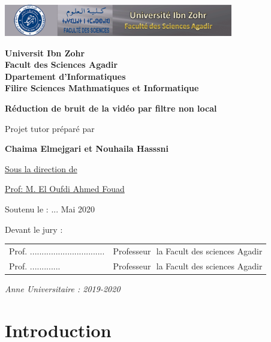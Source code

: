 \documentclass[12pt,a4paper]{report}
\numberwithin{equation}{subsection}
\numberwithin{equation}{section}
\begin{document}
\begin{titlepage}
\begin{center}

\vfill
\includegraphics[width=0.75\textwidth]{fsa.png}

\large{\textbf{Universit Ibn Zohr\\
Facult des Sciences Agadir\\
Dpartement d'Informatiques\\
Filire Sciences Mathmatiques et Informatique
}}

\vfill

\Large\textbf{Réduction de bruit de la vidéo\vspace{0.2in} par  filtre non local }

\vfill

\large{ Projet tutor pr\'{e}par\'{e} par }

\textbf{Chaima Elmejgari et Nouhaila Hasssni }

\vspace{1.5cm}

\underline{ Sous la direction de }

\underline{Prof: M. El Oufdi Ahmed Fouad }

\vfill


Soutenu le : ... Mai 2020
\end{center}

\vfill

\noindent Devant le jury :


\bigskip

\begin{tabular}{ll}
Prof. ................................& Professeur  la Facult des sciences Agadir\\
Prof. .............& Professeur  la   Facult des sciences Agadir
\end{tabular}

\vfill
\begin{center}
\emph{Anne Universitaire : 2019-2020}
\end{center}


\end{titlepage}



\vfill

\chapter*{Introduction}
\end{document}
